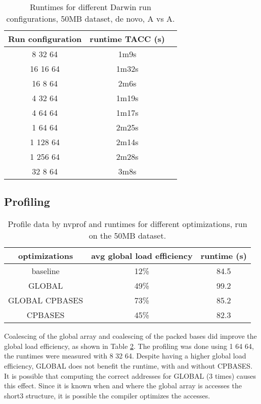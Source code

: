 \documentclass[../thesis.tex]{subfiles}
\begin{document}
\begin{table}
\centering
\caption{Runtimes for different Darwin run configurations, 50MB dataset, de novo, A vs A.}
\label{tbl:darwin6}
\begin{tabular}{c|cc}
Run configuration & runtime TACC (s) \\ \hline
 8 32 64 & 1m9s \\
16 16 64 & 1m32s \\
16  8 64 & 2m6s \\
 4 32 64 & 1m19s \\
 4 64 64 & 1m17s \\
 1 64 64 & 2m25s \\
1 128 64 & 2m14s \\
1 256 64 & 2m28s \\
 32 8 64 & 3m8s \\
\end{tabular}
\end{table}





\newpage



\subsection{Profiling}

\begin{table}
\centering
\caption{Profile data by nvprof and runtimes for different optimizations, run on the 50MB dataset.}
\label{tbl:darwin_prof}
\begin{tabular}{c c c}
optimizations & avg global load efficiency & runtime (s) \\ \hline
baseline & 12\% & 84.5 \\
GLOBAL & 49\% & 99.2 \\
GLOBAL CPBASES & 73\% & 85.2 \\
CPBASES & 45\% & 82.3 \\
\end{tabular}
\end{table}

Coalescing of the global array and coalescing of the packed bases did improve the global load efficiency, as shown in Table \ref{tbl:darwin_prof}.
The profiling was done using 1 64 64, the runtimes were measured with 8 32 64.
Despite having a higher global load efficiency, GLOBAL does not benefit the runtime, with and without CPBASES.
It is possible that computing the correct addresses for GLOBAL (3 times) causes this effect.
Since it is known when and where the global array is accesses the short3 structure, it is possible the compiler optimizes the accesses.
\end{document}

